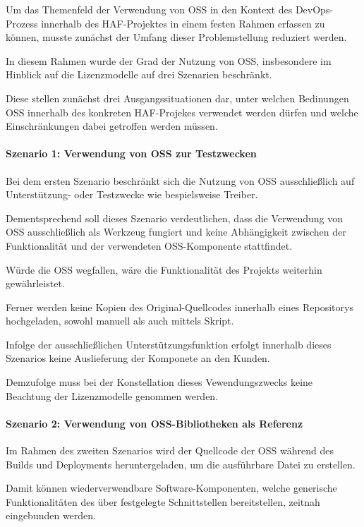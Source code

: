 Um das Themenfeld der Verwendung von OSS in den Kontext des DevOps-Prozess innerhalb des HAF-Projektes in einem festen Rahmen erfassen zu können, musste zunächst der Umfang dieser Problemstellung reduziert werden.  

In diesem Rahmen wurde der Grad der Nutzung von OSS, insbesondere im Hinblick auf die Lizenzmodelle auf drei Szenarien beschränkt. 

Diese stellen zunächst drei Ausgangssituationen dar, unter welchen Bedinungen OSS innerhalb des konkreten HAF-Projekes verwendet werden dürfen und welche Einschränkungen dabei getroffen werden müssen.   

\paragraph{Szenario 1: Verwendung von OSS zur Testzwecken}

Bei dem ersten Szenario beschränkt sich die Nutzung von OSS ausschließlich auf Unterstützung- oder Testzwecke wie bespielsweise Treiber. 

Dementsprechend soll dieses Szenario verdeutlichen, dass die Verwendung von OSS ausschließlich als Werkzeug fungiert und keine Abhängigkeit zwischen der Funktionalität und der verwendeten OSS-Komponente stattfindet. 

Würde die OSS wegfallen, wäre die Funktionalität des Projekts weiterhin gewährleistet. 

Ferner werden keine Kopien des Original-Quellcodes innerhalb eines Repositorys hochgeladen, sowohl manuell als auch mittels Skript. 

Infolge der ausschließlichen Unterstützungsfunktion erfolgt innerhalb dieses Szenarios keine Auslieferung der Komponete an den Kunden. 

Demzufolge muss bei der Konstellation dieses Vewendungszwecks keine Beachtung der Lizenzmodelle genommen werden. 

\paragraph{Szenario 2: Verwendung von OSS-Bibliotheken als Referenz}

Im Rahmen des zweiten Szenarios wird der Quellcode der OSS während des Builds und Deployments heruntergeladen, um die ausführbare Datei zu erstellen. 

Damit können wiederverwendbare Software-Komponenten, welche generische Funktionalitäten des über festgelegte Schnittstellen bereitstellen, zeitnah eingebunden werden.

